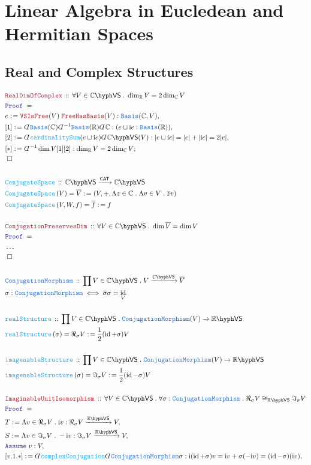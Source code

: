 \documentclass[12pt]{scrartcl}%
\newcommand{\TYPE}[1]{\textcolor{NavyBlue}{\mathtt{#1}}}%
\newcommand{\FUNC}[1]{\textcolor{Cerulean}{\mathtt{#1}}}%
\newcommand{\LOGIC}[1]{\textcolor{Blue}{\mathtt{#1}}}%
\newcommand{\THM}[1]{\textcolor{Maroon}{\mathtt{#1}}}%
\renewcommand{\.}{\; . \;} %
\newcommand{\de}{: \kern 0.1pc =} %
\newcommand{\Act}[1]{\left( #1 \right)} %
\newcommand{\Theorem}[2]{& \THM{#1} \, :: \, #2 \\ & \Proof = \\ } %
\newcommand{\DeclareType}[2]{& \TYPE{#1} \, :: \, #2 \\}%
\newcommand{\DefineType}[3]{& #1 : \TYPE{#2} \iff #3 \\}%
\newcommand{\DeclareFunc}[2]{& \FUNC{#1} \, :: \, #2 \\}%
\newcommand{\DefineNamedFunc}[4]{&  \FUNC{#1}\Act{#2} = #3 \de #4 \\}%
\newcommand{\Page}[1]{ \begin{align*} #1 \end{align*}  }%
\newcommand{ \bd }{ \ByDef }%
\newcommand{\NoProof}{ & \ldots \\ \EndProof}%
\newcommand{\Reals}{\mathbb{R}}%
\newcommand{\Complex}{\mathbb{C}}%
\DeclareMathOperator*{\id}{id}%
\newcommand{\Say}[3]{& #1 \de #2 : #3, \\} %
\newcommand{\Conclude}[3]{& #1 \de #2 : #3; \\}%
\newcommand{\Assume}[2]{& \LOGIC{Assume} \; #1 : #2, \\} %
\newcommand{\QED}{\; \square} %
\newcommand{\EndProof}{& \QED \\} %
\newcommand{\ByDef}{\rotatebox[origin=c]{-180}{$D$}}%
\newcommand{\Proof}{\LOGIC{Proof} \; } %
\newcommand{\Arrow}[1]{\xrightarrow{#1}}%
\newcommand{\CAT}{\mathsf{CAT}} %
\newcommand{\Basis}{\TYPE{Basis}} %
\newcommand{\VS}[1]{#1\hyph\mathsf{VS}} %
\begin{document}
\section{Linear Algebra in Eucledean and Hermitian Spaces}
\subsection{Real and Complex Structures}
\Page{	
	\Theorem{RealDimOfComplex}{\forall V \in \VS{\Complex} \. \dim_{\Reals} V = 2 \dim_{\Complex} V}
	\Say{e}{\THM{VSIsFree}(V)\;\THM{FreeHasBasis}(V)}{\Basis(\Complex,V)}
	\Say{[1]}{\bd \TYPE{Basis}(\Complex)\bd^{-1}\Basis(\Reals)\bd \Complex}{(e \sqcup\mathrm{i}e :\Basis(\Reals))}
	\Say{[2]}{\bd\FUNC{cardinalitySum}(e \sqcup \mathrm{i}e)\bd\VS{\Complex}(V)}{|e \sqcup \mathrm{i}e| = |e| + |\mathrm{i}e| = 2|e|}
	\Conclude{[*]}{\bd^{-1} \dim V [1][2]}{\dim_{\Reals} V = 2 \dim_{\Complex} V}
	\EndProof
	\\
	\DeclareFunc{ConjugateSpace}{\VS{\Complex} \Arrow{\CAT} \VS{\Complex}}
	\DefineNamedFunc{ConjugateSpace}{V}{\overline{V}}{(V,+,\Lambda z \in \Complex \. \Lambda v \in V \. \overline{z}v)}
	\DefineNamedFunc{ConjugateSpace}{V,W,f}{\overline{f}}{f}
	\\
	\Theorem{ConjugationPreservesDim}{\forall V \in \VS{\Complex} \. \dim \overline{V} = \dim V}
	\NoProof
	\\
	\DeclareType{ConjugationMorphism}{\prod V \in \VS{\Complex} \. V \Arrow{\VS{\Complex}} \overline{V}}
	\DefineType{\sigma}{ConjugationMorphism}{\overline{\sigma} \sigma = \id_{V}}
	\\
	\DeclareFunc{realStructure}{\prod V \in \VS{\Complex} \. \TYPE{ConjugationMorphism}(V) \to \VS{\Reals}}
	\DefineNamedFunc{realStructure}{\sigma}{\Re_\sigma V}{\frac{1}{2}(\id + \sigma)V}
	\\
	\DeclareFunc{imagenableStructure}{\prod V \in \VS{\Complex} \. \TYPE{ConjugationMorphism}(V) \to \VS{\Reals}}
	\DefineNamedFunc{imagenableStructure}{\sigma}{\Im_\sigma V}{\frac{1}{2}(\id - \sigma)V}
	\\
	\Theorem{ImaginableUnitIsomorphism}{\forall V \in \VS{\Complex} \. \forall \sigma : \TYPE{ConjugationMorphism} \. \Re_\sigma V \cong_{\VS{\Reals}} \Im_\sigma V}
	\Say{T}{\Lambda v \in \Re_\sigma V \. \mathrm{i}v }{\Re_\sigma V \Arrow{\VS{\Reals}} V }
	\Say{S}{\Lambda v \in \Im_\sigma V \. -\mathrm{i}v}{\Im_\sigma V \Arrow{\VS{\Reals}} V }
	\Assume{v}{V}
	\Say{[v.1.*]}{\bd \FUNC{complexConjugation}\bd\TYPE{ConjugationMorphism}\sigma}{  \mathrm{i}(\id + \sigma)v = \mathrm{i}v + \sigma(-\mathrm{i}v) =(\id - \sigma)(\mathrm{i}v)   }
}
\end{document}
